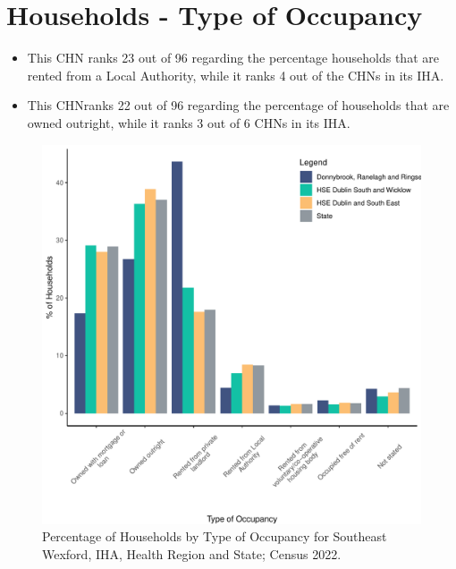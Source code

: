 \documentclass{article}
\begin{document}
\section{Households - Type of Occupancy}\label{sect:Households}
\begin{itemize}
\item This CHN ranks  23 out of 96 regarding the percentage households that are rented from a Local Authority, while it ranks  4 out of the CHNs in its IHA. 
\item This CHNranks  22 out of 96 regarding the percentage of households that are owned outright, while it ranks   3 out of 6 CHNs in its IHA.
\end{itemize}
\begin{figure}[H]
	\centering
	\includegraphics[width = 140mm]{../figures/HouseholdsED.pdf}
	\caption{Percentage of Households by Type of Occupancy for Southeast Wexford, IHA, Health Region and State; Census 2022.}
	\label{fig:vbnv}
	\end{figure}
\end{document}
